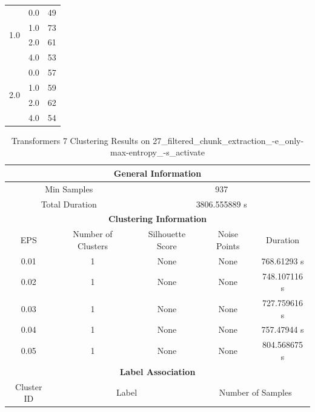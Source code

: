 \begin{longtable}{|c|c|c|c|c|}
\hline
\multirow{4}{*}{1.0} & \multicolumn{2}{c|}{0.0} & \multicolumn{2}{c|}{49} \\
& \multicolumn{2}{c|}{1.0} & \multicolumn{2}{c|}{73} \\
& \multicolumn{2}{c|}{2.0} & \multicolumn{2}{c|}{61} \\
& \multicolumn{2}{c|}{4.0} & \multicolumn{2}{c|}{53} \\
\hline
\multirow{4}{*}{2.0} & \multicolumn{2}{c|}{0.0} & \multicolumn{2}{c|}{57} \\
& \multicolumn{2}{c|}{1.0} & \multicolumn{2}{c|}{59} \\
& \multicolumn{2}{c|}{2.0} & \multicolumn{2}{c|}{62} \\
& \multicolumn{2}{c|}{4.0} & \multicolumn{2}{c|}{54} \\
\hline
\end{longtable}


\begin{longtable}{|c|c|c|c|c|}
\caption{Transformers 7 Clustering Results on 27\_filtered\_chunk\_extraction\_-e\_only-max-entropy\_-s\_activate} \label{tab:27_filtered_chunk_extraction_-e_only-max-entropy_-s_activate_transformers_7_clustering_results}\\
\hline
\multicolumn{5}{|c|}{\textbf{General Information}} \\
\hline
\multicolumn{2}{|c|}{Min Samples} & \multicolumn{3}{c|}{937} \\
\multicolumn{2}{|c|}{Total Duration} & \multicolumn{3}{c|}{3806.555889 s} \\
\hline
\multicolumn{5}{|c|}{\textbf{Clustering Information}} \\
\hline
EPS & Number of Clusters & Silhouette Score & Noise Points & Duration \\
0.01 & 1 & None & None & 768.61293 s\\
0.02 & 1 & None & None & 748.107116 s\\
0.03 & 1 & None & None & 727.759616 s\\
0.04 & 1 & None & None & 757.47944 s\\
0.05 & 1 & None & None & 804.568675 s\\
\hline
\multicolumn{5}{|c|}{\textbf{Label Association}} \\
\hline
Cluster ID & \multicolumn{2}{c|}{Label} & \multicolumn{2}{c|}{Number of Samples} \\
\hline
\end{longtable}


